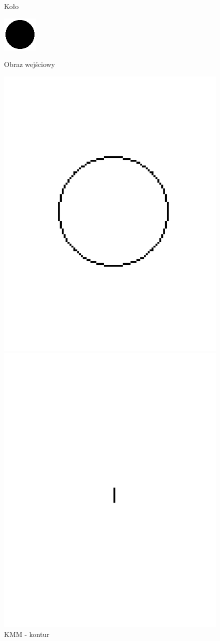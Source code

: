 \documentclass[11pt]{article}
\begin{document}
\begin{figure}[!ht] 
  \caption{Koło}
  \label{ fig7} 
  \begin{minipage}[b]{0.5\linewidth}
    \centering
    \includegraphics[width=.5\linewidth]{../images/circle} 
    \caption{Obraz wejściowy} 
    \vspace{4ex}
  \end{minipage}%
  \begin{minipage}[b]{0.5\linewidth}
    \centering
    \includegraphics[width=.5\linewidth]{../samples/circle_kmm_contour} 
    \caption{KMM - kontur} 
    \vspace{4ex}
  \end{minipage} 
  \begin{minipage}[b]{0.5\linewidth}
    \centering
    \includegraphics[width=.5\linewidth]{../samples/circle_kmm} 

\end{minipage}
\end{figure}
\end{document}
